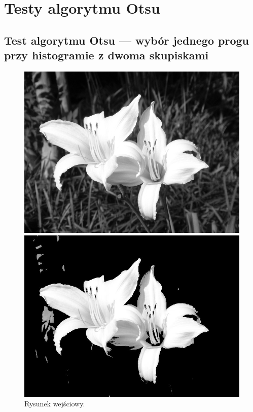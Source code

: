 \documentclass[10pt]{llncs}
\begin{document}
\section{Testy algorytmu Otsu}

\subsection{Test algorytmu Otsu --- wybór jednego progu przy histogramie z dwoma skupiskami}

\begin{figure}[!htb]
  \includegraphics[width=\linewidth]{img/01.jpg}
  \caption{Rysunek wejściowy.}\label{fig:1}
\endminipage\hfill
{}
  \includegraphics[width=\linewidth]{img/01_region_01.jpg}

\end{figure}
\end{document}
